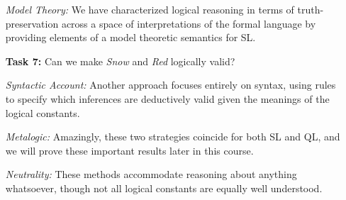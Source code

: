 \documentclass[a4paper, 11pt]{article} %
\begin{document}
\begin{enumerate}[leftmargin=1.2in,labelsep=.15in] %
  \item[\it Model Theory:] We have characterized logical reasoning in terms of truth-preservation across a space of interpretations of the formal language by providing elements of a model theoretic semantics for SL.
  \item[\bf Task 7:] Can we make \textit{Snow} and \textit{Red} logically valid?
  \item[\it Syntactic Account:] Another approach focuses entirely on syntax, using rules to specify which inferences are deductively valid given the meanings of the logical constants.
  \item[\it Metalogic:] Amazingly, these two strategies coincide for both SL and QL, and we will prove these important results later in this course.
  \item[\it Neutrality:] These methods accommodate reasoning about anything whatsoever, though not all logical constants are equally well understood.
\end{enumerate}
\end{document}
